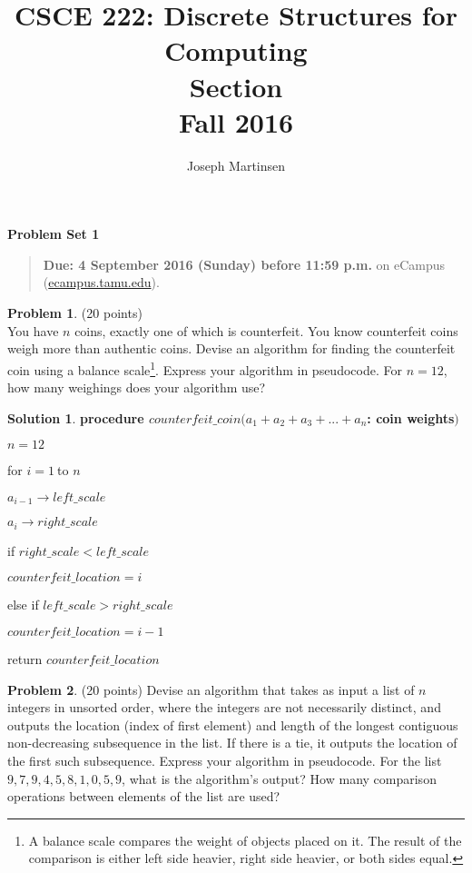 \documentclass{article}
\title{CSCE 222: Discrete Structures for Computing\\Section \mysectionnumber\\Fall 2016}
\author{Joseph Martinsen}
\theoremstyle{definition}
\newtheorem{problem}{Problem}
\newtheorem*{solution}{Solution}
\newcommand{\problemset}[1]{\begin{center}\textbf{Problem Set #1}\end{center}}
\newcommand{\duedate}[1]{\begin{quote}\textbf{Due: #1} on eCampus (\url{ecampus.tamu.edu}).\end{quote}}
\begin{document}
\maketitle

\problemset{1}

\duedate{4 September 2016 (Sunday) before 11:59 p.m.}

\bigskip

\begin{problem} (20 points)\\
You have $n$ coins, exactly one of which is counterfeit.  You know counterfeit coins weigh more than authentic coins.  Devise an algorithm for finding the counterfeit coin using a balance scale\footnote{A balance scale compares the weight of objects placed on it.  The result of the comparison is either left side heavier, right side heavier, or both sides equal.}.  Express your algorithm in pseudocode.  For $n=12$, how many weighings does your algorithm use?
\end{problem}

\begin{solution}

\item \bf procedure $counterfeit\_coin(a_{1}+a_{2}+a_{3}+...+a_{n}$: coin weights$)$

$n=12$

for $i=1\ $to $n$

\qquad $a_{i-1}\rightarrow left\_scale$

\qquad $a_{i}\rightarrow right\_scale$

\qquad if $right\_scale<left\_scale$

\qquad \qquad $counterfeit\_location=i$

\qquad else if $left\_scale>right\_scale$

\qquad \qquad $counterfeit\_location=i-1$

return $counterfeit\_location$

\end{solution}

\newpage

\begin{problem}
(20 points)\newline
Devise an algorithm that takes as input a list of $n$ integers in unsorted
order, where the integers are not necessarily distinct, and outputs the
location (index of first element) and length of the longest contiguous
non-decreasing subsequence in the list. If there is a tie, it outputs the
location of the first such subsequence. Express your algorithm in
pseudocode. For the list $9,7,9,4,5,8,1,0,5,9$, what is the algorithm's
output? How many comparison operations between elements of the list are used?
\end{problem}
\end{document}
